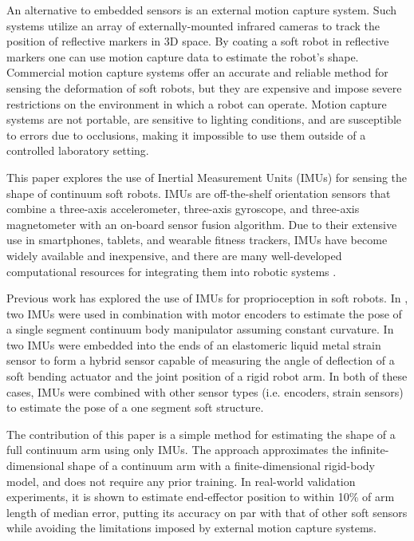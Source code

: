 An alternative to embedded sensors is an external motion capture system.
Such systems utilize an array of externally-mounted infrared cameras to track the position of reflective markers in 3D space.
By coating a soft robot in reflective markers one can use motion capture data to estimate the robot’s shape.
Commercial motion capture systems offer an accurate and reliable method for sensing the deformation of soft robots, but they are expensive and impose severe restrictions on the environment in which a robot can operate.
Motion capture systems are not portable, are sensitive to lighting conditions, and are susceptible to errors due to occlusions, making it impossible to use them outside of a controlled laboratory setting.

This paper explores the use of Inertial Measurement Units (IMUs) for sensing the shape of continuum soft robots.
IMUs are off-the-shelf orientation sensors that combine a three-axis accelerometer, three-axis gyroscope, and three-axis magnetometer with an on-board sensor fusion algorithm.
Due to their extensive use in smartphones, tablets, and wearable fitness trackers, IMUs have become widely available and inexpensive, and there are many well-developed computational resources for integrating them into robotic systems \cite{ahmad2013reviews}.

Previous work has explored the use of IMUs for proprioception in soft robots.
In \cite{hughes2020sensing}, two IMUs were used in combination with motor encoders to estimate the pose of a single segment continuum body manipulator assuming constant curvature.
In \cite{yirmibesoglu2016hybrid} two IMUs were embedded into the ends of an elastomeric liquid metal strain sensor to form a hybrid sensor capable of measuring the angle of deflection of a soft bending actuator and the joint position of a rigid robot arm. 
In both of these cases, IMUs were combined with other sensor types (i.e. encoders, strain sensors) to estimate the pose of a one segment soft structure. 

The contribution of this paper is a simple method for estimating the shape of a full continuum arm using only IMUs.
The approach approximates the infinite-dimensional shape of a continuum arm with a finite-dimensional rigid-body model, and does not require any prior training.
In real-world validation experiments, it is shown to estimate end-effector position to within 10\% of arm length of median error, putting its accuracy on par with that of other soft sensors while avoiding the limitations imposed by external motion capture systems.

